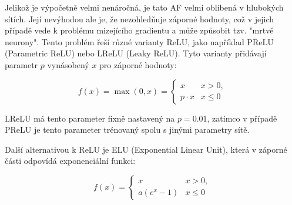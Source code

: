 Jelikož je výpočetně velmi nenáročná, je tato AF velmi oblíbená v hlubokých
sítích. Její nevýhodou ale je, že nezohledňuje záporné hodnoty, což v jejich
případě vede k problému mizejícího gradientu a může způsobit tzv. "mrtvé
neurony". Tento problém řeší různé varianty ReLU, jako například PReLU
(Parametric ReLU) nebo LReLU (Leaky ReLU). Tyto varianty přidávají parametr $p$
vynásobený $x$ pro záporné hodnoty:

\begin{equation*}
    f(x)=\max(0,x)=\begin{cases}x&x>0,\\p \cdot x&x\leq0\end{cases}
\end{equation*}

LReLU má tento parameter fixně nastavený na $p=0.01$, zatímco v případě PReLU
je tento parameter trénovaný spolu s jinými parametry sítě.

Další alternativou k ReLU je ELU (Exponential Linear Unit), která v záporné
části odpovídá exponenciální funkci:

\begin{equation*}
    f(x)=\begin{cases}x&x>0,\\a \left(e^{x}-1\right)&x\leq0\end{cases}
\end{equation*}

\begin{center}
\end{center}

